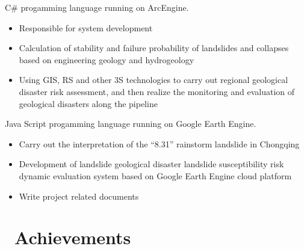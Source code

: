 \documentclass{resume}
\begin{document}

C\# progamming language running on ArcEngine.

\begin{itemize}
  \item Responsible for system development
  \item Calculation of stability and failure probability of landslides and collapses based on engineering geology and hydrogeology
  \item Using GIS, RS and other 3S technologies to carry out regional geological disaster risk assessment, and then realize the monitoring and evaluation of geological disasters along the pipeline
\end{itemize}


Java Script progamming language running on Google Earth Engine.

\begin{itemize}
  \item Carry out the interpretation of the “8.31” rainstorm landslide in Chongqing
  \item Development of landslide geological disaster landslide susceptibility risk dynamic evaluation system based on Google Earth Engine cloud platform
  \item Write project related documents
\end{itemize}

\section{\faHeartO\ Achievements}
\end{document}
